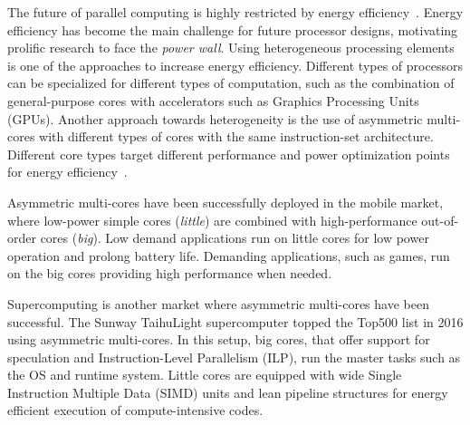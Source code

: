 




\iffalse

The future of parallel computing is highly restricted by energy 
efficiency~\cite{Kogge_Exascale_TR08}. Energy efficiency has become the main 
challenge for future processor designs, motivating prolific research to face the 
\emph{power wall}. Using heterogeneous processing elements is one of the 
approaches to increase energy efficiency. Different types of processors can 
be specialized for different types of computation, such as the combination of 
general-purpose cores with accelerators such as Graphics Processing Units (GPUs). 
Another approach towards heterogeneity is the use of asymmetric multi-cores 
with different types of cores with the same instruction-set architecture. Different core types 
target different performance and power optimization points for energy
efficiency~\cite{Kumar:ISCA2004,Balakrishnan:ISCA2005}. 

Asymmetric multi-cores have been successfully deployed in the mobile market, where 
low-power simple cores (\emph{little}) are combined with 
high-performance out-of-order cores (\emph{big}). Low demand applications
run on little cores for low power operation and prolong battery life. Demanding
applications, such as games, run on the big cores providing high performance
when needed.

Supercomputing is another market where asymmetric multi-cores have been successful. 
The Sunway TaihuLight supercomputer topped the Top500 list in 2016 using asymmetric multi-cores. 
In this setup, big cores, that offer support for speculation and Instruction-Level Parallelism (ILP), run the master tasks such as the OS and runtime system.
Little cores are equipped with wide Single Instruction Multiple Data (SIMD) units and lean pipeline structures for energy efficient execution of compute-intensive codes. 

